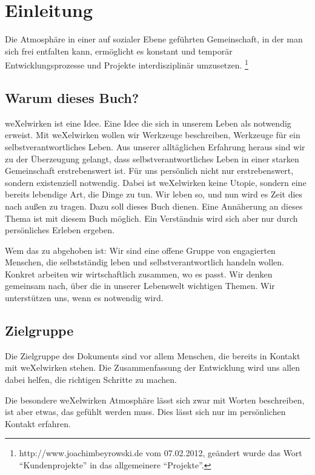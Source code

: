 \chapter{Einleitung}
\glqq
Die Atmosphäre in einer auf sozialer Ebene geführten Gemeinschaft, in der man sich frei entfalten kann, ermöglicht es konstant und temporär Entwicklungsprozesse und Projekte interdisziplinär umzusetzen. 
\grqq \footnote{http://www.joachimbeyrowski.de vom 07.02.2012, geändert wurde das Wort "`Kundenprojekte"' in das allgemeinere "`Projekte"'.}

  \section{Warum dieses Buch?}
weXelwirken ist eine Idee.
%
Eine Idee die sich in unserem Leben als notwendig erweist. 
%
Mit weXelwirken wollen wir Werkzeuge beschreiben, Werkzeuge für ein selbstverantwortliches Leben.
%
Aus unserer alltäglichen Erfahrung heraus sind wir zu der Überzeugung gelangt, dass selbstverantwortliches Leben in einer starken Gemeinschaft erstrebenswert ist.
%
Für uns persönlich nicht nur erstrebenswert, sondern existenziell notwendig.
%
Dabei ist weXelwirken keine Utopie, sondern eine bereits lebendige Art, die Dinge zu tun.
%
Wir leben so, und nun wird es Zeit dies nach außen zu tragen.
%
Dazu soll dieses Buch dienen.
%
Eine Annäherung an dieses Thema ist mit diesem Buch möglich.
%
Ein Verständnis wird sich aber nur durch persönliches Erleben ergeben.



Wem das zu abgehoben ist: Wir sind eine offene Gruppe von engagierten Menschen, die selbstständig leben und selbstverantwortlich handeln wollen.
%
Konkret arbeiten wir wirtschaftlich zusammen, wo es passt.
%
Wir denken gemeinsam nach, über die in unserer Lebenswelt wichtigen Themen.
%
Wir unterstützen uns, wenn es notwendig wird.
  \section{Zielgruppe}
Die Zielgruppe des Dokuments sind vor allem Menschen, die bereits in Kontakt mit weXelwirken stehen.
%
Die Zusammenfassung der Entwicklung wird uns allen dabei helfen, die richtigen Schritte zu machen. 




Die besondere weXelwirken Atmosphäre lässt sich zwar mit Worten beschreiben, ist aber etwas, das gefühlt werden muss.
%
Dies lässt sich nur im persönlichen Kontakt erfahren.

